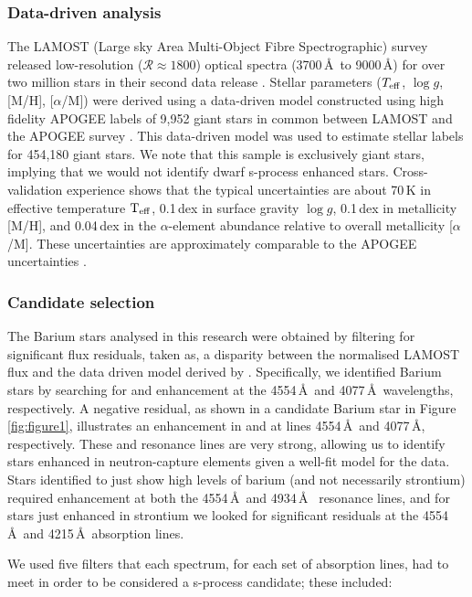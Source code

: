 \documentclass[a4paper,fleqn,usenatbib]{mnras}
\begin{document}
\subsubsection{Data-driven analysis}
The LAMOST (Large sky Area Multi-Object Fibre Spectrographic) survey released low-resolution ($\mathcal{R} \approx 1800$) optical spectra (3700\,\AA\ to 9000\,\AA) for over two million stars in their second data release \citep{luo2015}. Stellar parameters ($T_{\rm eff}$, $\log{g}$, [M/H], [$\alpha$/M]) were derived using a data-driven model constructed using high fidelity APOGEE labels of 9,952 giant stars in common between LAMOST and the APOGEE survey \citep{ho2017}. This data-driven model was used to estimate stellar labels for 454,180 giant stars. We note that this sample is exclusively giant stars, implying that we would not identify dwarf s-process enhanced stars. Cross-validation experience shows that the typical uncertainties are about 70\,K in effective temperature $\rm T_{\rm eff}$, 0.1\,dex in surface gravity $\log{g}$, 0.1\,dex in metallicity [M/H], and 0.04\,dex in the $\alpha$-element abundance relative to overall metallicity [$\alpha$/M]. These uncertainties are approximately comparable to the APOGEE uncertainties \citep{alam2015}.


\subsubsection{Candidate selection} \label{sec:cand}
The Barium stars analysed in this research were obtained by filtering for significant flux residuals, taken as, a disparity between the normalised LAMOST flux and the data driven model derived by \citet{ho2017}. Specifically, we identified Barium stars by searching for  and  enhancement at the 4554\,\AA\ and 4077\,\AA\ wavelengths, respectively. A negative residual, as shown in a candidate Barium star in Figure \ref{fig:figure1}, illustrates an enhancement in  and  at lines 4554\,\AA\, and 4077\,\AA, respectively. These  and  resonance lines are very strong, allowing us to identify stars enhanced in neutron-capture elements given a well-fit model for the data. Stars identified to just show high levels of barium (and not necessarily strontium) required enhancement at both the 4554\,\AA\ and 4934\,\AA\  resonance lines, and for stars just enhanced in strontium we looked for significant residuals at the 4554\,\AA\ and 4215\,\AA\ absorption lines.  

We used five filters that each spectrum, for each set of absorption lines, had to meet in order to be considered a s-process candidate; these included:
\end{document}
